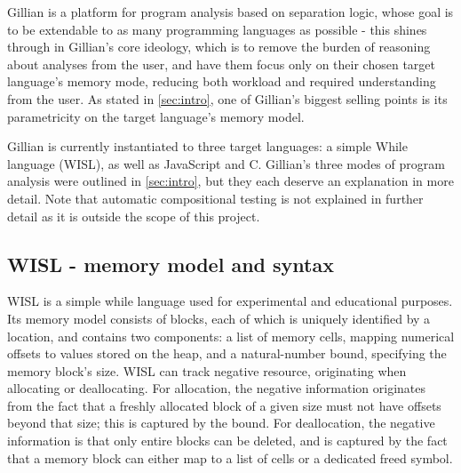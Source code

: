 Gillian is a platform for program analysis based on separation logic, whose
goal is to be extendable to as many programming languages as possible - this
shines through in Gillian's core ideology, which is to remove the burden of
reasoning about analyses from the user, and have them focus only on their
chosen target language's memory mode, reducing both workload and required
understanding from the user. As stated in \autoref{sec:intro}, one of
Gillian's biggest selling points is its parametricity on the target language's
memory model.

Gillian is currently instantiated to three target languages: a simple While
language (WISL), as well as JavaScript and C. Gillian's three modes of program
analysis were outlined in \autoref{sec:intro}, but they each deserve an
explanation in more detail. Note that automatic compositional testing is not
explained in further detail as it is outside the scope of this project.

\subsection{WISL - memory model and syntax}
WISL is a simple while language used for experimental and educational purposes. Its memory model consists of blocks, each of which is uniquely identified by a location, and contains two components: a list of memory cells, mapping numerical offsets to values stored on the heap, and a natural-number bound, specifying the memory block's size.  WISL can track negative resource, originating when allocating or deallocating. For allocation, the negative information originates from the fact that a freshly allocated block of a given size must not have offsets beyond that size; this is captured by the bound. For deallocation, the negative information is that only entire blocks can be deleted, and is captured by the fact that a memory block can either map to a list of cells or a dedicated freed symbol.

